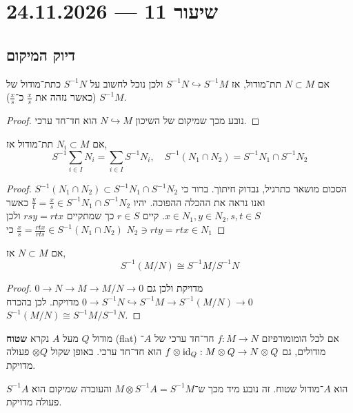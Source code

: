 \section{שיעור 11 --- 24.11.2026}
\subsection{דיוק המיקום}
\begin{corollary}
	אם $N \subset M$ תת־מודול, אז $S^{-1} N \hookrightarrow S^{-1} M$ ולכן נוכל לחשוב על $S^{-1} N$ כתת־מודול של $S^{-1} M$ (כאשר נזהה את $\frac{x}{s}$ כ־$\frac{x}{s}$).
\end{corollary}
\begin{proof}
	נובע מכך שמיקום של השיכון $N \hookrightarrow M$ הוא חד־חד ערכי.
\end{proof}
\begin{corollary}
	אם $N_i \subset M$ תת־מודול אז,
	\[
		S^{-1} \sum_{i \in I} N_i
		= \sum_{i \in I} S^{-1} N_i,
		\quad
		S^{-1} (N_1 \cap N_2) = S^{-1} N_1 \cap S^{-1} N_2
	\]
\end{corollary}
\begin{proof}
	הסכום מושאר כתרגיל, נבדוק חיתוך.
	ברור כי $S^{-1} (N_1 \cap N_2) \subset S^{-1} N_1 \cap S^{-1} N_2$ ואנו נראה את ההכלה ההפוכה.
	יהיו $\frac{y}{t} = \frac{x}{s} \in S^{-1} N_1 \cap S^{-1} N_2$ כאשר $x \in N_1, y \in N_2, s, t \in S$.
	קיים $r \in S$ כך שמתקיים $r s y = r t x$ ולכן $\frac{x}{s} = \frac{r t x}{r t s} \in S^{-1} (N_1 \cap N_2)$ כי $N_2 \ni r t y = r t x \in N_1$
\end{proof}
\begin{corollary}
	אם $N \subset M$ אז,
	\[
		S^{-1} (M / N)
		\cong S^{-1} M / S^{-1} N
	\]
\end{corollary}
\begin{proof}
	$0 \to N \to M \to M / N \to 0$ מדויקת ולכן גם $0 \to S^{-1} N \hookrightarrow S^{-1} M \to S^{-1} (M / N) \to 0$ מדויקת.
	לכן בהכרח $S^{-1} (M / N) \cong S^{-1} M / S^{-1} N$.
\end{proof}
\begin{definition}
	מודול $Q$ מעל $A$ נקרא \textbf{שטוח} (flat) אם לכל הומומורפיזם $f : M \to N$ חד־חד ערכי של $A$־מודולים, גם $f \otimes \operatorname{id}_Q : M \otimes Q \to N \otimes Q$ הוא חד־חד ערכי.
	באופן שקול $\otimes Q$ פעולה מדויקת.
\end{definition}
\begin{example}
	$S^{-1} A$ הוא $A$־מודול שטוח.
	זה נובע מיד מכך ש־$M \otimes S^{-1} A = S^{-1} M$ והעובדה שמיקום הוא פעולה מדויקת.
\end{example}
